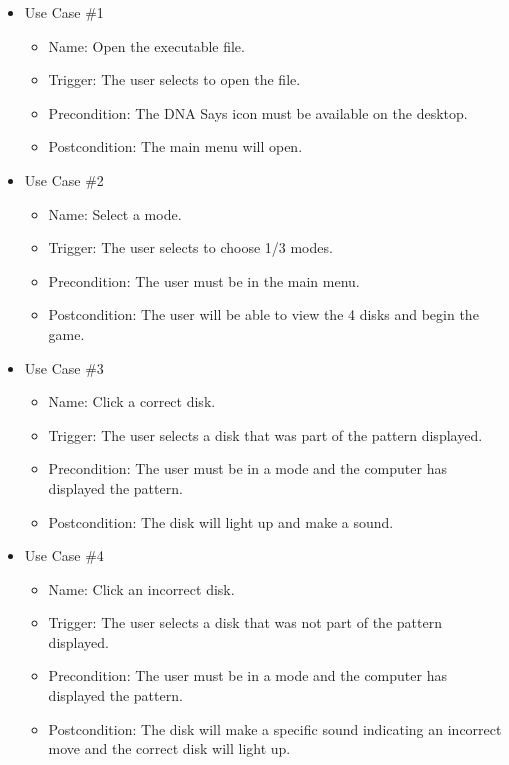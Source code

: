 \documentclass[12pt, titlepage]{article}
\begin{document}
\begin{itemize}

\item Use Case \#1
\begin{itemize}
\item Name: Open the executable file.
\item Trigger: The user selects to open the file.
\item Precondition: The DNA Says icon must be available on the desktop.
\item Postcondition: The main menu will open.
\end{itemize}

\item Use Case \#2
\begin{itemize}
\item Name: Select a mode.
\item Trigger: The user selects to choose 1/3 modes.
\item Precondition: The user must be in the main menu.
\item Postcondition: The user will be able to view the 4 disks and begin the game.
\end{itemize}

\item Use Case \#3
\begin{itemize}
\item Name: Click a correct disk.
\item Trigger: The user selects a disk that was part of the pattern displayed. 
\item Precondition: The user must be in a mode and the computer has displayed the pattern.
\item Postcondition: The disk will light up and make a sound.
\end{itemize}

\item Use Case \#4
\begin{itemize}
\item Name: Click an incorrect disk.
\item Trigger: The user selects a disk that was not part of the pattern displayed.
\item Precondition: The user must be in a mode and the computer has displayed the pattern.
\item Postcondition: The disk will make a specific sound indicating an incorrect move and the correct disk will light up.
\end{itemize}


\end{itemize}
\end{document}
